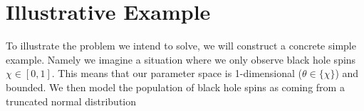 \documentclass[twocolumn,usenames,dvipsnames,linenumbers]{aastex631}
\begin{document}

\section{Illustrative Example}
\label{sec:Illustrative Example}
To illustrate the problem we intend to solve, we will construct a concrete simple example. Namely we imagine a situation where we only observe black hole spins $\chi \in [0,1]$. This means that our parameter space is 1-dimensional ($\theta \in \{\chi\}$) and bounded. 
We then model the population of black hole spins as coming from a truncated normal distribution
\end{document}
